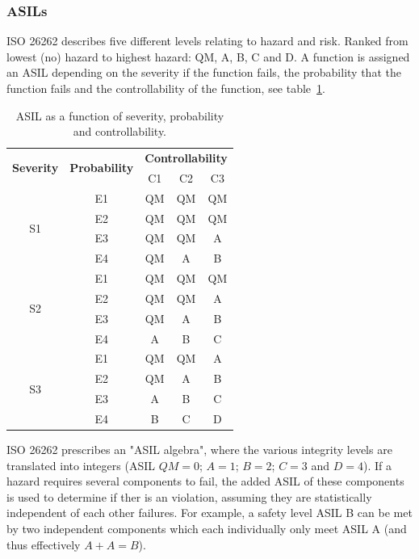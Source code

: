 \subsubsection{ASILs}
ISO 26262 describes five different levels relating to hazard and risk. Ranked from lowest (no) hazard to highest hazard: QM, A, B, C and D. A function is assigned an ASIL depending on the severity if the function fails, the probability that the function fails and the controllability of the function, see table~\ref{table:ASIL}.

\begin{table}[H]
\centering
\begin{tabular}{|c|c|c|c|c|}
\hline
\multirow{2}{*}{\textbf{Severity}} &\multirow{2}{*}{\textbf{Probability}} &\multicolumn{3}{|c|}{\textbf{Controllability}} \\ \cline{3-5}
 & &C1 &C2 &C3 \\ \hline
\multirow{4}{*}{S1} & E1 & QM & QM & QM \\ \cline{2-5}
 & E2 & QM & QM & QM \\ \cline{2-5}
 & E3 & QM & QM & A \\ \cline{2-5}
 & E4 & QM & A & B \\ \hline
\multirow{4}{*}{S2} & E1 & QM & QM & QM \\ \cline{2-5}
 & E2 & QM & QM & A \\ \cline{2-5}
 & E3 & QM & A & B \\ \cline{2-5}
 & E4 & A & B & C \\ \hline
\multirow{4}{*}{S3} & E1 & QM & QM & A \\ \cline{2-5}
 & E2 & QM & A & B \\ \cline{2-5}
 & E3 & A & B & C \\ \cline{2-5}
 & E4 & B & C & D \\ \hline
\end{tabular}
\caption{ASIL as a function of severity, probability and controllability.}
\label{table:ASIL}
\end{table}

ISO 26262 prescribes an "ASIL algebra", where the various integrity levels are translated into integers (ASIL $QM = 0$; $A = 1$; $B = 2$; $C = 3$ and $D = 4$). If a hazard requires several components to fail, the added ASIL of these components is used to determine if ther is an violation, assuming they are statistically independent of each other failures. For example, a safety level ASIL B can be met by two independent components which each individually only meet ASIL A (and thus effectively $A + A = B$).~\cite{azevedo2014} \\ %


